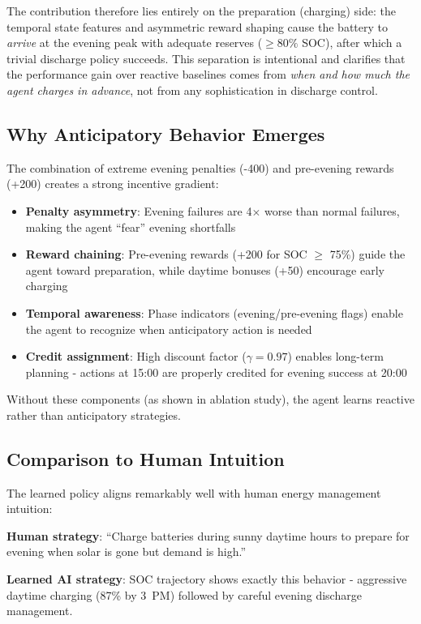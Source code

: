 \documentclass[11pt,a4paper]{article}
\begin{document}
The contribution therefore lies entirely on the preparation (charging) side: the temporal state features and asymmetric reward shaping cause the battery to \emph{arrive} at the evening peak with adequate reserves ($\geq 80\%$ SOC), after which a trivial discharge policy succeeds. This separation is intentional and clarifies that the performance gain over reactive baselines comes from \emph{when and how much the agent charges in advance}, not from any sophistication in discharge control.

\subsection{Why Anticipatory Behavior Emerges}

The combination of extreme evening penalties (-400) and pre-evening rewards (+200) creates a strong incentive gradient:

\begin{itemize}
    \item \textbf{Penalty asymmetry}: Evening failures are 4$\times$ worse than normal failures, making the agent ``fear'' evening shortfalls
    \item \textbf{Reward chaining}: Pre-evening rewards (+200 for SOC $\geq$ 75\%) guide the agent toward preparation, while daytime bonuses (+50) encourage early charging
    \item \textbf{Temporal awareness}: Phase indicators (evening/pre-evening flags) enable the agent to recognize when anticipatory action is needed
    \item \textbf{Credit assignment}: High discount factor ($\gamma = 0.97$) enables long-term planning - actions at 15:00 are properly credited for evening success at 20:00
\end{itemize}

Without these components (as shown in ablation study), the agent learns reactive rather than anticipatory strategies.

\subsection{Comparison to Human Intuition}

The learned policy aligns remarkably well with human energy management intuition:

\textbf{Human strategy}: ``Charge batteries during sunny daytime hours to prepare for evening when solar is gone but demand is high.''

\textbf{Learned AI strategy}: SOC trajectory shows exactly this behavior - aggressive daytime charging (87\% by 3~PM) followed by careful evening discharge management.
\end{document}
